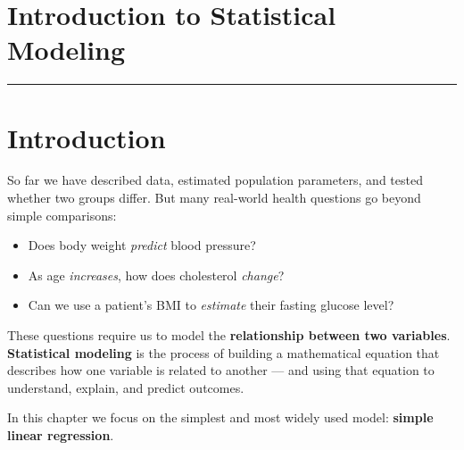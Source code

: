 \documentclass[
  12pt,
  letterpaper,
]{book}
\providecommand{\tightlist}{%
  \setlength{\itemsep}{0pt}\setlength{\parskip}{0pt}}
\begin{document}

\chapter{Introduction to Statistical
Modeling}\label{introduction-to-statistical-modeling}

\begin{center}\rule{0.5\linewidth}{0.5pt}\end{center}


\chapter*{Introduction}\label{introduction-5}


\begin{tcolorbox}[enhanced jigsaw, arc=.35mm, bottomrule=.15mm, bottomtitle=1mm, breakable, colback=white, colbacktitle=quarto-callout-note-color!10!white, colframe=quarto-callout-note-color-frame, coltitle=black, left=2mm, leftrule=.75mm, opacityback=0, opacitybacktitle=0.6, rightrule=.15mm, title={💡 Why Does This Matter?}, titlerule=0mm, toprule=.15mm, toptitle=1mm]

So far we have described data, estimated population parameters, and
tested whether two groups differ. But many real-world health questions
go beyond simple comparisons:

\begin{itemize}
\tightlist
\item
  Does body weight \emph{predict} blood pressure?
\item
  As age \emph{increases}, how does cholesterol \emph{change}?
\item
  Can we use a patient's BMI to \emph{estimate} their fasting glucose
  level?
\end{itemize}

These questions require us to model the \textbf{relationship between two
variables}. \textbf{Statistical modeling} is the process of building a
mathematical equation that describes how one variable is related to
another --- and using that equation to understand, explain, and predict
outcomes.

In this chapter we focus on the simplest and most widely used model:
\textbf{simple linear regression}.

\end{tcolorbox}
\end{document}
